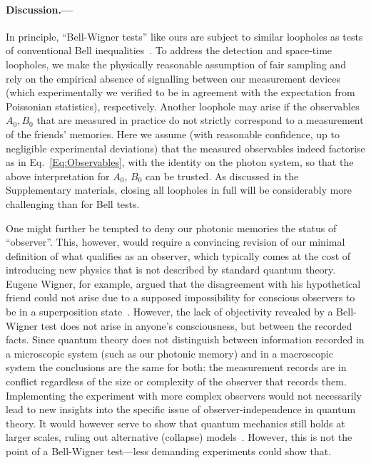 \documentclass[aps,floatfix,superscriptaddress,twocolumn,tightenlines,amsmath,amssymb,nofootinbib,10pt]{revtex4-1}
\begin{document}
\paragraph*{Discussion.---} 
In principle, ``Bell-Wigner tests'' like ours are subject to similar loopholes as tests of conventional Bell inequalities~\cite{LarssonReview}. To address the detection and space-time loopholes, we make the physically reasonable assumption of fair sampling and rely on the empirical absence of signalling between our measurement devices (which experimentally we verified to be in agreement with the expectation from Poissonian statistics), respectively. Another loophole may arise if the observables $A_0, B_0$ that are measured in practice do not strictly correspond to a measurement of the friends' memories. Here we assume (with reasonable confidence, up to negligible experimental deviations) that the measured observables indeed factorise as in Eq.~\eqref{Eq:Observables}, with the identity on the photon system, so that the above interpretation for $A_0$, $B_0$ can be trusted. As discussed in the Supplementary materials, closing all loopholes in full will be considerably more challenging than for Bell tests. 

One might further be tempted to deny our photonic memories the status of ``observer''. This, however, would require a convincing revision of our minimal definition of what qualifies as an observer, which typically comes at the cost of introducing new physics that is not described by standard quantum theory. Eugene Wigner, for example, argued that the disagreement with his hypothetical friend could not arise due to a supposed impossibility for conscious observers to be in a superposition state~\cite{Wigner1961}. However, the lack of objectivity revealed by a Bell-Wigner test does not arise in anyone's consciousness, but between the recorded facts. Since quantum theory does not distinguish between information recorded in a microscopic system (such as our photonic memory) and in a macroscopic system the conclusions are the same for both: the measurement records are in conflict regardless of the size or complexity of the observer that records them. Implementing the experiment with more complex observers would not necessarily lead to new insights into the specific issue of observer-independence in quantum theory. It would however serve to show that quantum mechanics still holds at larger scales, ruling out alternative (collapse) models~\cite{GRW1986}. However, this is not the point of a Bell-Wigner test---less demanding experiments could show that. 
\end{document}

